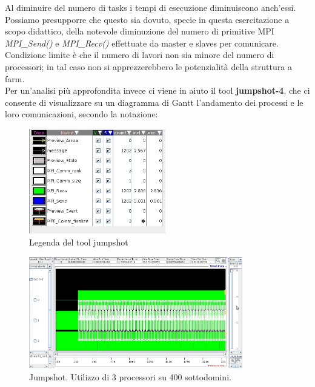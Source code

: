 Al diminuire del numero di tasks i tempi di esecuzione diminuiscono anch'essi. Possiamo presupporre che questo sia dovuto, specie in questa esercitazione a scopo didattico, della notevole diminuzione del numero di primitive MPI \emph{MPI\_Send()} e \emph{MPI\_Recv()} effettuate da master e slaves per comunicare. Condizione limite \`e che il numero di lavori non sia minore del numero di processori; in tal caso non si apprezzerebbero le potenzialit\`a della struttura a farm.
\\
\newpage
Per un'analisi pi\`u approfondita invece ci viene in aiuto il tool \mbox{\textbf{jumpshot-4}}, che ci consente di visualizzare su un diagramma di Gantt l'andamento dei processi e le loro comunicazioni, secondo la notazione: 

\begin{figure}[htp]
\centering
\includegraphics[width=0.53\textwidth]{Immagini_relazione/9_Legenda53pJS.jpg}
\caption{Legenda del tool jumpshot}
\label{}
\end{figure}


\begin{figure}[htp]
\centering
\includegraphics[width=0.83\textwidth]{Immagini_relazione/7_JS3p400.jpg}
\caption{Jumpshot. Utilizzo di 3 processori su 400 sottodomini.}
\label{}
\end{figure}

